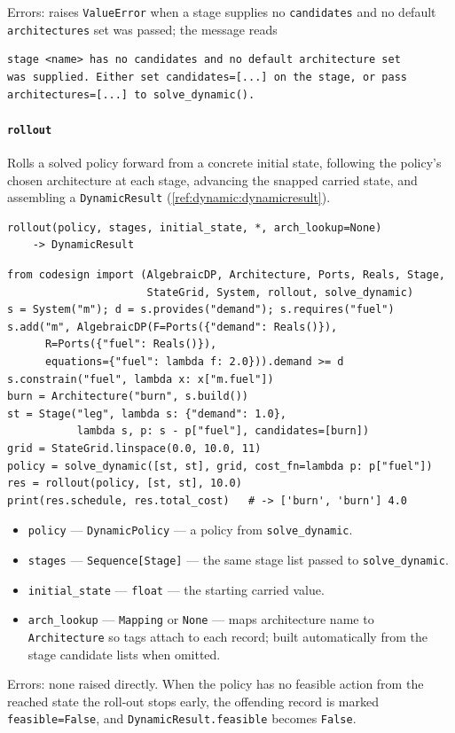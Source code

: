 \documentclass[11pt,a4paper]{article}
\begin{document}
Errors: raises \texttt{ValueError} when a stage supplies no
\texttt{candidates} and no default \texttt{architectures} set was passed; the
message reads
\begin{lstlisting}[language={},numbers=none,keywordstyle={}]
stage <name> has no candidates and no default architecture set
was supplied. Either set candidates=[...] on the stage, or pass
architectures=[...] to solve_dynamic().
\end{lstlisting}

\paragraph{\texttt{rollout}}\label{ref:dynamic:rollout}
Rolls a solved policy forward from a concrete initial state, following the
policy's chosen architecture at each stage, advancing the snapped carried
state, and assembling a \texttt{DynamicResult}
(\ref{ref:dynamic:dynamicresult}).
\begin{lstlisting}
rollout(policy, stages, initial_state, *, arch_lookup=None)
    -> DynamicResult
\end{lstlisting}
\begin{lstlisting}
from codesign import (AlgebraicDP, Architecture, Ports, Reals, Stage,
                      StateGrid, System, rollout, solve_dynamic)
s = System("m"); d = s.provides("demand"); s.requires("fuel")
s.add("m", AlgebraicDP(F=Ports({"demand": Reals()}),
      R=Ports({"fuel": Reals()}),
      equations={"fuel": lambda f: 2.0})).demand >= d
s.constrain("fuel", lambda x: x["m.fuel"])
burn = Architecture("burn", s.build())
st = Stage("leg", lambda s: {"demand": 1.0},
           lambda s, p: s - p["fuel"], candidates=[burn])
grid = StateGrid.linspace(0.0, 10.0, 11)
policy = solve_dynamic([st, st], grid, cost_fn=lambda p: p["fuel"])
res = rollout(policy, [st, st], 10.0)
print(res.schedule, res.total_cost)   # -> ['burn', 'burn'] 4.0
\end{lstlisting}
\begin{itemize}[nosep]
  \item \texttt{policy} --- \texttt{DynamicPolicy} --- a policy from
    \texttt{solve\_dynamic}.
  \item \texttt{stages} --- \texttt{Sequence[Stage]} --- the same stage list
    passed to \texttt{solve\_dynamic}.
  \item \texttt{initial\_state} --- \texttt{float} --- the starting carried
    value.
  \item \texttt{arch\_lookup} --- \texttt{Mapping} or \texttt{None} --- maps
    architecture name to \texttt{Architecture} so tags attach to each
    record; built automatically from the stage candidate lists when
    omitted.
\end{itemize}
Errors: none raised directly. When the policy has no feasible action from
the reached state the roll-out stops early, the offending record is marked
\texttt{feasible=False}, and \texttt{DynamicResult.feasible} becomes
\texttt{False}.
\end{document}
